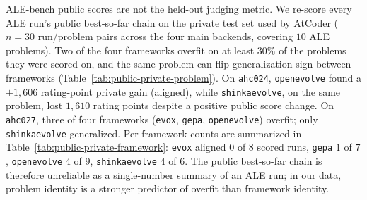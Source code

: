 ALE-bench public scores are not the held-out judging metric. We re-score every ALE run's public best-so-far chain on the private test set used by AtCoder ($n{=}30$ run/problem pairs across the four main backends, covering $10$ ALE problems). Two of the four frameworks overfit on at least $30\%$ of the problems they were scored on, and the same problem can flip generalization sign between frameworks (Table~\ref{tab:public-private-problem}). On \texttt{ahc024}, \texttt{openevolve} found a $+1{,}606$ rating-point private gain (aligned), while \texttt{shinkaevolve}, on the same problem, lost $1{,}610$ rating points despite a positive public score change. On \texttt{ahc027}, three of four frameworks (\texttt{evox}, \texttt{gepa}, \texttt{openevolve}) overfit; only \texttt{shinkaevolve} generalized. Per-framework counts are summarized in Table~\ref{tab:public-private-framework}: \texttt{evox} aligned $0$ of $8$ scored runs, \texttt{gepa} $1$ of $7$, \texttt{openevolve} $4$ of $9$, \texttt{shinkaevolve} $4$ of $6$. The public best-so-far chain is therefore unreliable as a single-number summary of an ALE run; in our data, problem identity is a stronger predictor of overfit than framework identity.

\begin{table}[h]
\centering
\caption{\textbf{Public vs.\ private generalization across frameworks on ALE.} Each cell reports the change in AtCoder rating-point performance from seed to the final public-best program along the run's public best-so-far chain, when re-scored on the held-out private test set. Bold cells flag \emph{overfitting} (public $\uparrow$, private $\downarrow$); ``---'' indicates a single-event lineage, an unscorable seed, or a missing private metric.}
\label{tab:public-private-problem}
\small
\setlength{\tabcolsep}{8pt}
\renewcommand{\arraystretch}{1.15}

\end{table}

\begin{table}[h]
\centering
\caption{\textbf{Per-framework counts of aligned vs.\ overfitting public$\to$private trajectories on ALE.} A run is \emph{aligned} if both public and private scores improved from seed to final, \emph{mild overfit} if private worsened by $\le 200$ rating points despite a public gain, and \emph{severe overfit} if by more than $200$ points; the remainder is no movement on private.}
\label{tab:public-private-framework}
\small
\setlength{\tabcolsep}{8pt}
\renewcommand{\arraystretch}{1.15}

\end{table}

